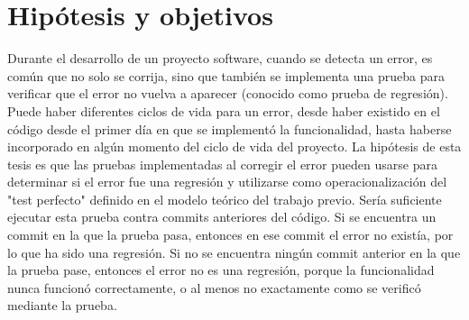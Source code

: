 \section{Hipótesis y objetivos}
\label{sec:resumen:hipotesis}

Durante el desarrollo de un proyecto software, cuando se detecta un error, es común que no solo se corrija, sino que también se implementa una prueba para verificar que el error no vuelva a aparecer (conocido como prueba de regresión). 
Puede haber diferentes ciclos de vida para un error, desde haber existido en el código desde el primer día en que se implementó la funcionalidad, hasta haberse incorporado en algún momento del ciclo de vida del proyecto.
La hipótesis de esta tesis es que las pruebas implementadas al corregir el error pueden usarse para determinar si el error fue una regresión y utilizarse como operacionalización del "test perfecto" definido en el modelo teórico del trabajo previo. 
Sería suficiente ejecutar esta prueba contra commits anteriores del código. 
Si se encuentra un commit en la que la prueba pasa, entonces en ese commit el error no existía, por lo que ha sido una regresión. 
Si no se encuentra ningún commit anterior en la que la prueba pase, entonces el error no es una regresión, porque la funcionalidad nunca funcionó correctamente, o al menos no exactamente como se verificó mediante la prueba.

